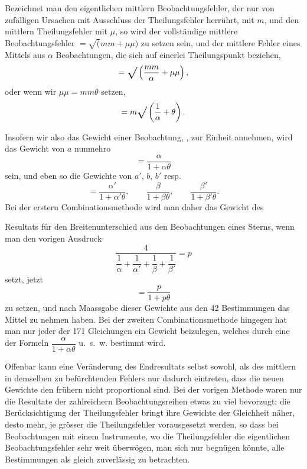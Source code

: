 Bezeichnet man den eigentlichen mittlern Beobachtungsfehler, der nur
von zufälligen Ursachen mit Ausschluss der Theilungsfehler herrührt, mit \(m\),
und den mittlern Theilungsfehler mit \(\mu\), so wird der vollständige mittlere
Beobachtungsfehler \(=\surd(mm+\mu\mu)\) zu setzen sein, und der mittlere Fehler eines
Mittels aus \(\alpha\) Beobachtungen, die sich auf einerlei Theilungspunkt beziehen,
\[
=\ixrad\left(\frac{mm}{\alpha}+\mu\mu\right),
\]
\noindent oder wenn wir \(\mu\mu=mm\theta\) setzen,
\[
=m\ixrad\left(\frac1\alpha+\theta\right).
\]

Insofern wir also das Gewicht einer Beobachtung, ,
zur Einheit annehmen, wird das Gewicht von \(a\) nunmehro
\[
=\frac{\alpha}{1+\alpha\theta}
\]
\noindent sein, und eben so die Gewichte von \(a'\), \(b\), \(b'\) resp.
\[
=\frac{\alpha'}{1+\alpha'\theta},\qquad
\frac{\beta}{1+\beta\theta},\qquad
\frac{\beta'}{1+\beta'\theta}.
\]
Bei der erstern Combinationsmethode wird man daher das Gewicht des
\par

\par\clearpage
\noindent\makebox[12mm][l]{}\par\medskip

\noindent Resultats für den Breitenunterschied aus den Beobachtungen eines Sterns,
wenn man den vorigen Ausdruck
\[
\frac4{\dfrac1\alpha+\dfrac1{\alpha'}+\dfrac1\beta+\dfrac1{\beta'}}=p
\]
\noindent setzt, jetzt
\[
=\frac p{1+p\theta}
\]
\noindent zu setzen, und nach Maassgabe dieser Gewichte aus den 42 Bestimmungen
das Mittel zu nehmen haben. Bei der zweiten Combinationsmethode hingegen
hat man nur jeder der 171 Gleichungen ein Gewicht beizulegen, welches
durch eine der Formeln \(\dfrac{\alpha}{1+\alpha\theta}\) u.\ s.\ w. bestimmt wird.

Offenbar kann eine Veränderung des Endresultats selbst sowohl, als des
mittlern in demselben zu befürchtenden Fehlers nur dadurch eintreten, dass
die neuen Gewichte den frühern nicht proportional sind. Bei der vorigen
Methode waren nur die Resultate der zahlreichern Beobachtungsreihen etwas
zu viel bevorzugt; die Berücksichtigung der Theilungsfehler bringt ihre
Gewichte der Gleichheit näher, desto mehr, je grösser die Theilungsfehler
vorausgesetzt werden, so dass bei Beobachtungen mit einem Instrumente, wo die
Theilungsfehler die eigentlichen Beobachtungsfehler sehr weit überwögen, man
sich nur begnügen könnte, alle Bestimmungen als gleich zuverlässig zu
betrachten.

